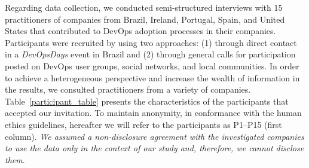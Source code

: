 Regarding data collection, we conducted semi-structured interviews with 15 practitioners of companies from
Brazil, Ireland, Portugal, Spain, and United States that
contributed to DevOps adoption processes in their companies. Participants
were recruited by using two approaches: (1) through direct contact in a \emph{DevOpsDays}
event in Brazil and (2) through general
calls for participation posted on DevOps user groups, social networks,
and local communities. In order to achieve a heterogeneous perspective
and increase the wealth of information in the results,
we consulted practitioners from a variety of companies.
Table~\ref{participant_table} presents the characteristics of the participants
that accepted our invitation.
To maintain anonymity, in conformance with the human ethics guidelines,
hereafter we will refer to the participants as P1--P15 (first column). \emph{We
assumed a non-disclosure agreement with the investigated companies to use the
data only in the context of our study and, therefore, we cannot disclose them}.

